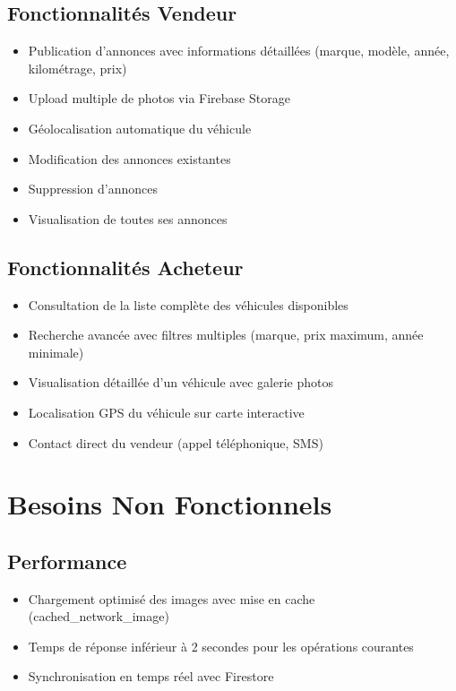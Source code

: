 \documentclass[11pt,a4paper]{article}
\begin{document}
\subsection{Fonctionnalités Vendeur}
\begin{itemize}[leftmargin=*]
    \item Publication d'annonces avec informations détaillées (marque, modèle, année, kilométrage, prix)
    \item Upload multiple de photos via Firebase Storage
    \item Géolocalisation automatique du véhicule
    \item Modification des annonces existantes
    \item Suppression d'annonces
    \item Visualisation de toutes ses annonces
\end{itemize}

\subsection{Fonctionnalités Acheteur}
\begin{itemize}[leftmargin=*]
    \item Consultation de la liste complète des véhicules disponibles
    \item Recherche avancée avec filtres multiples (marque, prix maximum, année minimale)
    \item Visualisation détaillée d'un véhicule avec galerie photos
    \item Localisation GPS du véhicule sur carte interactive
    \item Contact direct du vendeur (appel téléphonique, SMS)
\end{itemize}

\section{Besoins Non Fonctionnels}

\subsection{Performance}
\begin{itemize}[leftmargin=*]
    \item Chargement optimisé des images avec mise en cache (cached\_network\_image)
    \item Temps de réponse inférieur à 2 secondes pour les opérations courantes
    \item Synchronisation en temps réel avec Firestore
\end{itemize}
\end{document}
